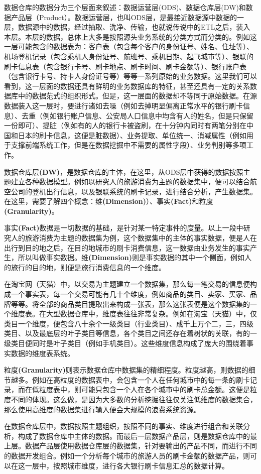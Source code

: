 \par 数据仓库的数据分为三个层面来叙述：数据运营层(ODS)、数据仓库层(DW)和数据产品层（Product）。数据运营层，也叫ODS层，是最接近数据源中数据的一层，数据源中的数据，经过抽取、洗净、传输，也就说传说中的ETL之后，装入本层。本层的数据，总体上大多是按照源头业务系统的分类方式而分类的。例如这一层可能包含的数据表为：客户表（包含每个客户的身份证号、姓名、住址等）、机场登机记录（包含乘机人身份证号、航班号、乘机日期、起飞城市等）、银联的刷卡信息表（包含银行卡号、刷卡地点、刷卡时间、刷卡金额等）、银行账户表（包含银行卡号、持卡人身份证号等）等等一系列原始的业务数据。这里我们可以看到，这一层面的数据还具有鲜明的业务数据库的特征，甚至还具有一定的关系数据库中的数据范式的组织形式。但是，这一层面的数据却不等同于原始数据。在源数据装入这一层时，要进行诸如去噪（例如去掉明显偏离正常水平的银行刷卡信息）、去重（例如银行账户信息、公安局人口信息中均含有人的姓名，但是只保留一份即可）、提脏（例如有的人的银行卡被盗刷，在十分钟内同时有两笔分别在中国和日本的刷卡信息，这便是脏数据）、业务提取、单位统一、消减属性（例如用于支撑前端系统工作，但是在数据挖掘中不需要的属性字段）、业务判别等多项工作。
\par 数据仓库层\textbf{(DW)}，是数据仓库的主体，在这里，从ODS层中获得的数据按照主题建立各种数据模型。例如以研究人的旅游消费为主题的数据集中，便可以结合航空公司的登机出行信息，以及银联系统的刷卡记录，进行结合分析，产生数据集。在这里，需要了解四个概念：维\textbf{(Dimension)}）、事实\textbf{(Fact)}和粒度\textbf{(Granularity)}。
\par 事实\textbf{(Fact)}数据是一切数据的基础，是针对某一特定事件的度量。以上一段中研究人的旅游消费为主题的数据集为例，这个数据集中的主体的事实数据，便是人在出行到目的地之后，在目的地城市的刷卡消费信息，这一数据由业务发生的事实产生，所以叫做事实数据。维\textbf{(Dimension)}则是事实数据的其中一个侧面，例如人的旅行的目的地，则便是旅行消费信息的一个维度。
\par 在淘宝网（天猫）中，以交易为主题建立一个数据集，那么每一笔交易的信息便构成一个事实表，每一个交易可能有几十个维度，例如商品的类目、卖家、买家、品牌等等。将全部的商品类目提取出来构成一张表，那么这张表便是这个数据集的一个维度表。在大型数据仓库中，维度表往往非常复杂。例如在淘宝（天猫）中，仅类目一个维度，便包含八十余个一级类目（行业类目）、成千上万个二，三，四级类目、以及最底层的叶子类目等信息，各个类目之间还存在着树状的关联，有的一级类目便同时是叶子类目（例如手机类目）。这些维度信息构成了庞大的围绕着事实数据的维度表系统。
\par 粒度\textbf{(Granularity)}则表示数据仓库中数据集的精细程度。粒度越高，则数据的细节越多。例如在高粒度的数据表中，会包含一个人在任何城市中的每一条的刷卡记录，而在低粒度表中，则可能只包含一个人在各个城市中的刷卡总金额。这便是粒度不同的体现。这么做，是因为大多数的分析挖掘往往仅关注低维度的数据集合，那么使用高维度的数据集进行输入便会大规模的浪费系统资源。
\par 在数据仓库层中，数据按照主题组织，按照不同的事实、维度进行组合和关联分析，构成了数据仓库中主体的数据。而最后一层数据产品层，则是数据仓库中的最上层。数据产品层使用数据仓库层的数据集，针对要输出的产品不同，而进行不同的数据开发组合。例如一个分析每个城市的旅游人员的刷卡金额的数据产品，则可以在这一层中，按照城市维度，进行各大银行刷卡信息汇总的数据计算。






